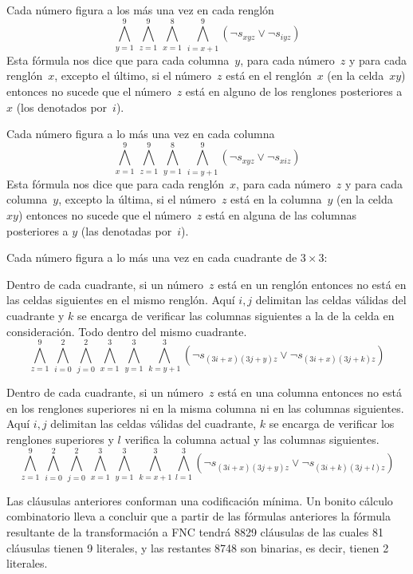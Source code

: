 \documentclass[11pt,letterpaper]{article}
\begin{document}
\item Cada número figura a los más una vez en cada renglón
$$ \bigwedge_{y=1}^9\,\bigwedge_{z=1}^9\,\bigwedge_{x=1}^8\,\bigwedge_{i=x+1}^9 
(\neg s_{xyz}\lor \neg s_{iyz}) $$
Esta fórmula nos dice que para cada columna~$y$, para cada número~$z$ y para 
cada renglón~$x$, excepto el último, si el número~$z$ está en el renglón~$x$ 
(en la celda~$xy$) entonces no sucede que el número~$z$ está en alguno de los 
renglones posteriores a~$x$ (los denotados por~$i$).

\item Cada número figura a lo más una vez en cada columna
$$ \bigwedge_{x=1}^9\,\bigwedge_{z=1}^9\,\bigwedge_{y=1}^8\,\bigwedge_{i=y+1}^9 
(\neg s_{xyz}\lor \neg s_{xiz})$$
Esta fórmula nos dice que para cada renglón~$x$, para cada número~$z$ y para 
cada columna~$y$, excepto la última, si el número~$z$ está en la columna~$y$ 
(en la celda~$xy$) entonces no sucede que el número~$z$ está en alguna de las 
columnas posteriores a $y$ (las denotadas por~$i$).

\item Cada número figura a lo más una vez en cada cuadrante de $3\times 3$: 
\bi
\item Dentro de cada cuadrante, si un número~$z$ está en un renglón entonces 
  no está en las celdas siguientes en el mismo renglón. Aquí $i,j$ delimitan 
  las celdas válidas del cuadrante y $k$ se encarga de verificar las columnas 
  siguientes a la de la celda en consideración. Todo dentro del mismo cuadrante.
  \[ 
   \bigwedge_{z=1}^9\,\bigwedge_{i=0}^2\,\bigwedge_{j=0}^2\,\bigwedge_{x=1}^3\,
   \bigwedge_ { y=1}^3\,\bigwedge_{k=y+1}^3 (\neg s_{(3i+x)(3j+y)z}\lor \neg 
    s_{(3i+x)(3j+k)z})
  \]
  
\item Dentro de cada cuadrante, si un número~$z$ está en una columna entonces 
  no está en los renglones superiores ni en la misma columna ni en las columnas 
  siguientes. Aquí $i,j$ delimitan las celdas válidas del cuadrante, $k$ se 
  encarga de verificar los renglones superiores y $l$ verifica la columna 
actual 
  y las columnas siguientes.
  \[
   \bigwedge_{z=1}^9\,\bigwedge_{i=0}^2\,\bigwedge_{j=0}^2\,\bigwedge_{x=1}^3\,
   \bigwedge_ { y=1}^3\,\bigwedge_{k=x+1}^3 \bigwedge_{l=1}^3 
    (\neg s_{(3i+x)(3j+y)z}\lor \neg s_{(3i+k)(3j+l)z})
  \]
\ei
\ei

Las cláusulas anteriores conforman una codificación m\'inima. Un bonito cálculo 
combinatorio lleva a concluir que a partir de las fórmulas anteriores la 
fórmula 
resultante de la transformación a FNC tendrá 8829 cláusulas de las cuales 81 
cláusulas tienen 9 literales, y las restantes 8748 son binarias, es decir, 
tienen 2 literales. \\
\end{document}
